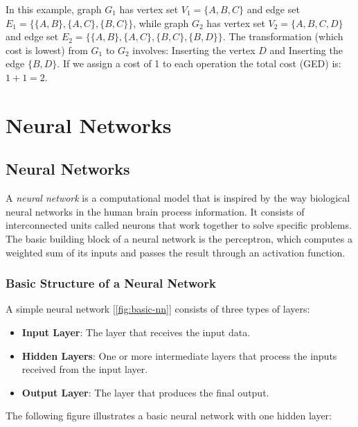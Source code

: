 \documentclass{article}
\begin{document}
In this example, graph $G_1$ has vertex set $V_1 = \{A, B, C\}$ and edge set $E_1 = \{\{A, B\}, \{A, C\}, \{B, C\}\}$, while graph $G_2$ has vertex set $V_2 = \{A, B, C, D\}$ and edge set $E_2 = \{\{A, B\}, \{A, C\}, \{B, C\}, \{B, D\}\}$. The transformation (which cost is lowest) from $G_1$ to $G_2$ involves: Inserting the vertex $D$ and Inserting the edge $\{B, D\}$. If we assign a cost of 1 to each operation the total cost (GED) is: $1+1=2$.

\section{Neural Networks}

\subsection{Neural Networks}

A \emph{neural network} is a computational model that is inspired by the way biological neural networks in the human brain process information. It consists of interconnected units called neurons that work together to solve specific problems. The basic building block of a neural network is the perceptron, which computes a weighted sum of its inputs and passes the result through an activation function.

\subsubsection{Basic Structure of a Neural Network}

A simple neural network [\autoref{fig:basic-nn}] consists of three types of layers:

\begin{itemize}
    \item \textbf{Input Layer}: The layer that receives the input data.
    \item \textbf{Hidden Layers}: One or more intermediate layers that process the inputs received from the input layer.
    \item \textbf{Output Layer}: The layer that produces the final output.
\end{itemize}

The following figure illustrates a basic neural network with one hidden layer:
\end{document}
